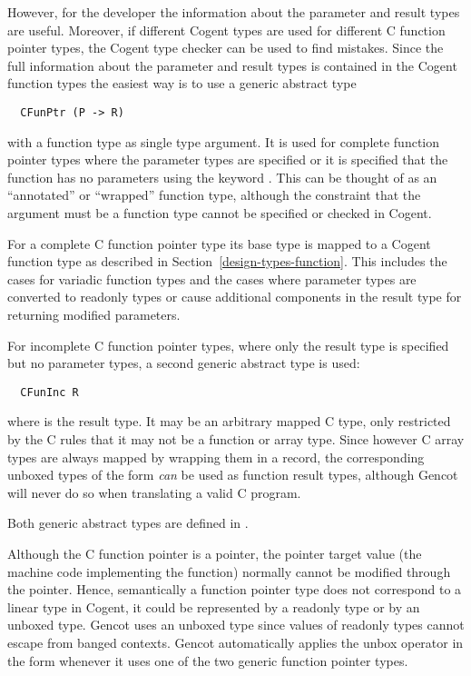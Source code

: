 However, for the developer the information about the parameter and result types are useful. Moreover, if different
Cogent types are used for different C function pointer types, the Cogent type checker can be used to find
mistakes. Since the full information about the parameter and result types is contained in the Cogent function types
the easiest way is to use a generic abstract type
\begin{verbatim}
  CFunPtr (P -> R)
\end{verbatim}
with a function type  as single type argument. It is used for complete function pointer types where the 
parameter types are specified or it is specified that the function has no parameters using the keyword . 
This can be thought of as an ``annotated'' or ``wrapped'' function type, although the constraint that the argument
must be a function type cannot be specified or checked in Cogent.

For a complete C function pointer type its base type is mapped to a Cogent function type as described in
Section~\ref{design-types-function}. This includes the cases for variadic function types and the cases where
parameter types are converted to readonly types or cause additional components in the result type for returning 
modified parameters.

For incomplete C function pointer types, where only the result type
is specified but no parameter types, a second generic abstract type is used:
\begin{verbatim}
  CFunInc R
\end{verbatim}
where  is the result type. It may be an arbitrary 
mapped C type, only restricted by the C rules that it may not be a function or array type. Since however C array types
are always mapped by wrapping them in a record, the corresponding unboxed types of the form 
\textit{can} be used as function result types, although Gencot will never do so when translating a valid C program.

Both generic abstract types are defined in .

Although the C function pointer is a pointer, the pointer target value (the machine code implementing the function) 
normally cannot be modified through the pointer. Hence, semantically a function pointer type does not correspond to a linear type
in Cogent, it could be represented by a readonly type or by an unboxed type. Gencot uses an unboxed type
since values of readonly types cannot escape from banged contexts. Gencot automatically applies the 
unbox operator in the form  whenever it uses one of the two generic function pointer types.

